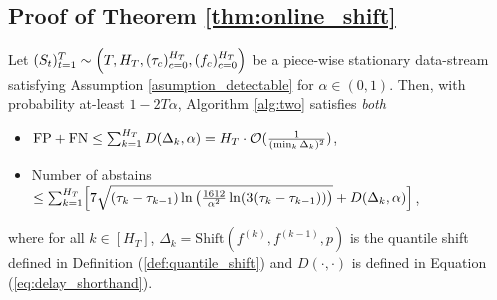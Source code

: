 \subsection{Proof of Theorem \ref{thm:online_shift}}


\begin{theorem*}[ \ref{thm:online_shift}]%
Let $(S_t)_{t = 1}^T \sim \Bigl(T,H_T, (\tau_c)_{c=0}^{H_T}, (f_c)_{c=0}^{H_T}\Bigr)$ be  a piece-wise stationary data-stream satisfying Assumption \ref{asumption_detectable} for $\alpha \in (0,1)$. Then, with probability at-least $1-2T\alpha$, Algorithm \ref{alg:two} satisfies {\em both}
\begin{itemize}
    \item $\text{FP} + \text{FN}  \leq \sum_{k=1}^{H_T}D(\Delta_{k},\alpha) = H_T \cdot {{\mathcal{O}}}(\frac{1}{(\min_k\Delta_{k})^2}) $, 
    \item Number of abstains $ \leq \sum_{k=1}^{H_T} \Bigl[ 7 \sqrt{(\tau_k-\tau_{k-1}) \ln \left( \frac{1612}{\alpha^2} \ln(3(\tau_k-\tau_{k-1})) \right)}  + D(\Delta_{k},\alpha) \Bigr]$,
\end{itemize}
where for all $k \in [H_T]$, $\Delta_{k} = \text{Shift} (f^{(k)},f^{(k-1)},p)$  is the quantile shift defined in Definition (\ref{def:quantile_shift}) and $D(\cdot,\cdot)$ is defined in Equation (\ref{eq:delay_shorthand}).
\end{theorem*}




